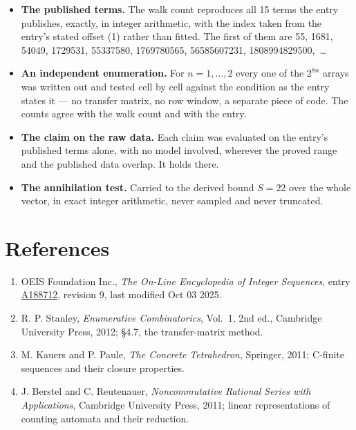 \documentclass[11pt]{article}
\theoremstyle{definition}
\begin{document}
\begin{itemize}

\item {\bfseries The published terms.} The walk count reproduces all 15 terms the entry publishes, exactly, in integer arithmetic, with the index taken from the entry's stated offset (1) rather than fitted. The first of them are 55, 1681, 54049, 1729531, 55337580, 1769780565, 56585607231, 1808994829500,~\dots

\item {\bfseries An independent enumeration.} For $n = 1,\dots,2$ every one of the $2^{8n}$ arrays was written out and tested cell by cell against the condition as the entry states it --- no transfer matrix, no row window, a separate piece of code. The counts agree with the walk count and with the entry.

\item {\bfseries The claim on the raw data.} Each claim was evaluated on the entry's published terms alone, with no model involved, wherever the proved range and the published data overlap. It holds there.

\item {\bfseries The annihilation test.} Carried to the derived bound $S = 22$ over the whole vector, in exact integer arithmetic, never sampled and never truncated.

\end{itemize}

\section{References}

\begin{enumerate}

\item OEIS Foundation Inc., \emph{The On-Line Encyclopedia of Integer Sequences}, entry \href{https://oeis.org/A188712}{A188712}, revision 9, last modified Oct 03 2025.

\item R. P. Stanley, \emph{Enumerative Combinatorics}, Vol.~1, 2nd ed., Cambridge University Press, 2012; \S4.7, the transfer-matrix method.

\item M. Kauers and P. Paule, \emph{The Concrete Tetrahedron}, Springer, 2011; C-finite sequences and their closure properties.

\item J. Berstel and C. Reutenauer, \emph{Noncommutative Rational Series with Applications}, Cambridge University Press, 2011; linear representations of counting automata and their reduction.

\end{enumerate}
\end{document}
